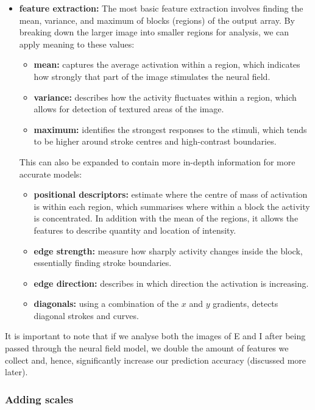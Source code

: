 \documentclass[10pt]{article}
\begin{document}
\begin{flushleft}
\begin{itemize}
        \item \textbf{feature extraction:}
        The most basic feature extraction involves finding the mean, variance, and maximum of blocks (regions) of the output array.
        By breaking down the larger image into smaller regions for analysis, we can apply meaning to these values:
        \begin{itemize}
            \item \textbf{mean:} captures the average activation within a region, which indicates how strongly that part
            of the image stimulates the neural field.
            \item \textbf{variance:} describes how the activity fluctuates within a region, which allows for detection of
            textured areas of the image.
            \item \textbf{maximum:} identifies the strongest responses to the stimuli, which tends to be higher around
            stroke centres and high-contrast boundaries.
        \end{itemize}
        This can also be expanded to contain more in-depth information for more accurate models:
        \begin{itemize}
            \item \textbf{positional descriptors:} estimate where the centre of mass of activation is within each region,
            which summarises where within a block the activity is concentrated.
            In addition with the mean of the regions, it allows the features to describe quantity and location of intensity.
            \item \textbf{edge strength:} measure how sharply activity changes inside the block, essentially finding stroke boundaries.
            \item \textbf{edge direction:} describes in which direction the activation is increasing.
            \item \textbf{diagonals:} using a combination of the $x$ and $y$ gradients, detects diagonal strokes and curves.
        \end{itemize}
    \end{itemize}

    It is important to note that if we analyse both the images of E and I after being passed through the neural field model,
    we double the amount of features we collect and, hence, significantly increase our prediction accuracy (discussed more later).

    \subsubsection{Adding scales}


\end{flushleft}
\end{document}
